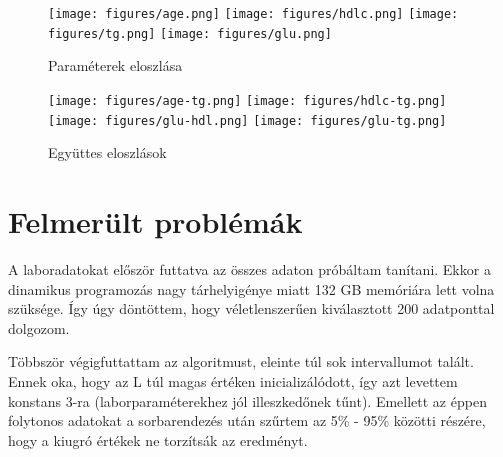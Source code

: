 \begin{figure}[htp]
    \centering
    \texttt{[image: figures/age.png]}
    \texttt{[image: figures/hdlc.png]}
    \texttt{[image: figures/tg.png]}
    \texttt{[image: figures/glu.png]}
    \caption{Paraméterek eloszlása}
    \label{fig:eloszlas}
\end{figure}

\begin{figure}[htp]
    \centering
    \texttt{[image: figures/age-tg.png]}
    \texttt{[image: figures/hdlc-tg.png]}
    \texttt{[image: figures/glu-hdl.png]}
    \texttt{[image: figures/glu-tg.png]}
    \caption{Együttes eloszlások}
    \label{fig:egyuttes}
\end{figure}

\section{Felmerült problémák}
A laboradatokat először futtatva az összes adaton próbáltam tanítani. Ekkor a dinamikus programozás nagy tárhelyigénye miatt 132 GB memóriára lett volna szüksége. Így úgy döntöttem, hogy véletlenszerűen kiválasztott 200 adatponttal dolgozom.

Többször végigfuttattam az algoritmust, eleinte túl sok intervallumot talált. Ennek oka, hogy az L túl magas értéken inicializálódott, így azt levettem konstans 3-ra (laborparaméterekhez jól illeszkedőnek tűnt). Emellett az éppen folytonos adatokat a sorbarendezés után szűrtem az 5\% - 95\% közötti részére, hogy a kiugró értékek ne torzítsák az eredményt.